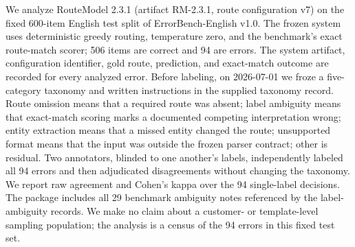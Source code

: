 We analyze RouteModel 2.3.1 (artifact RM-2.3.1, route configuration v7) on the fixed 600-item English test split of ErrorBench-English v1.0. The frozen system uses deterministic greedy routing, temperature zero, and the benchmark's exact route-match scorer; 506 items are correct and 94 are errors. The system artifact, configuration identifier, gold route, prediction, and exact-match outcome are recorded for every analyzed error. Before labeling, on 2026-07-01 we froze a five-category taxonomy and written instructions in the supplied taxonomy record. Route omission means that a required route was absent; label ambiguity means that exact-match scoring marks a documented competing interpretation wrong; entity extraction means that a missed entity changed the route; unsupported format means that the input was outside the frozen parser contract; other is residual. Two annotators, blinded to one another's labels, independently labeled all 94 errors and then adjudicated disagreements without changing the taxonomy. We report raw agreement and Cohen's kappa over the 94 single-label decisions. The package includes all 29 benchmark ambiguity notes referenced by the label-ambiguity records. We make no claim about a customer- or template-level sampling population; the analysis is a census of the 94 errors in this fixed test set.
